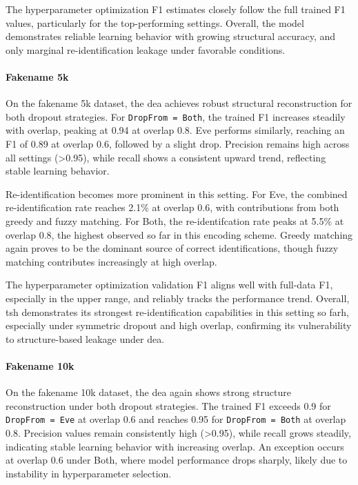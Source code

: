 The hyperparameter optimization F1 estimates closely follow the full trained F1 values, particularly for the top-performing settings.
Overall, the model demonstrates reliable learning behavior with growing structural accuracy, and only marginal re-identification leakage under favorable conditions.


\paragraph{Fakename 5k}

On the fakename 5k dataset, the \ac{dea} achieves robust structural reconstruction for both dropout strategies.
For \texttt{DropFrom = Both}, the trained F1 increases steadily with overlap, peaking at 0.94 at overlap 0.8.
Eve performs similarly, reaching an F1 of 0.89 at overlap 0.6, followed by a slight drop.
Precision remains high across all settings (>0.95), while recall shows a consistent upward trend, reflecting stable learning behavior.

Re-identification becomes more prominent in this setting.
For Eve, the combined re-identification rate reaches 2.1\% at overlap 0.6, with contributions from both greedy and fuzzy matching.
For Both, the re-identifcation rate peaks at 5.5\% at overlap 0.8, the highest observed so far in this encoding scheme.
Greedy matching again proves to be the dominant source of correct identifications, though fuzzy matching contributes increasingly at high overlap.

The hyperparameter optimization validation F1 aligns well with full-data F1, especially in the upper range, and reliably tracks the performance trend.
Overall, \ac{tsh} demonstrates its strongest re-identification capabilities in this setting so farh, especially under symmetric dropout and high overlap, confirming its vulnerability to structure-based leakage under \ac{dea}.


\paragraph{Fakename 10k}

On the fakename 10k dataset, the \ac{dea} again shows strong structure reconstruction under both dropout strategies.
The trained F1 exceeds 0.9 for \texttt{DropFrom = Eve} at overlap 0.6 and reaches 0.95 for \texttt{DropFrom = Both} at overlap 0.8.
Precision values remain consistently high (>0.95), while recall grows steadily, indicating stable learning behavior with increasing overlap.
An exception occurs at overlap 0.6 under Both, where model performance drops sharply, likely due to instability in hyperparameter selection.

